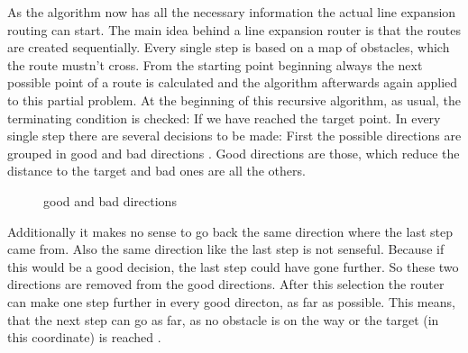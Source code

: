 As the algorithm now has all the necessary information the actual line expansion routing can start. The main idea behind a line expansion router is that the routes are created sequentially. Every single step is based on a map of obstacles, which the route mustn't cross. From the starting point beginning always the next possible point of a route is calculated and the algorithm afterwards again applied to this partial problem. At the beginning of this recursive algorithm, as usual, the terminating condition is checked: If we have reached the target point. In every single step there are several decisions to be made: First the possible directions are grouped in good and bad directions . Good directions are those, which reduce the distance to the target and bad ones are all the others.

\begin{figure}
	\centering
	
  	\caption{good and bad directions}
	\label{fig:router_good_bad_direction}
\end{figure}

Additionally it makes no sense to go back the same direction where the last step came from. Also the same direction like the last step is not senseful. Because if this would be a good decision, the last step could have gone further. So these two directions are removed from the good directions. After this selection the router can make one step further in every good directon, as far as possible. This means, that the next step can go as far, as no obstacle is on the way or the target (in this coordinate) is reached .

